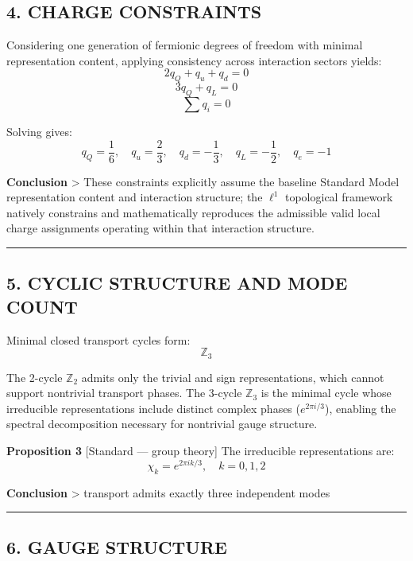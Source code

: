 \documentclass[
]{article}
\begin{document}
\subsection{4. CHARGE CONSTRAINTS}\label{charge-constraints}

Considering one generation of fermionic degrees of freedom with minimal
representation content, applying consistency across interaction sectors
yields: \[
2 q_Q + q_u + q_d = 0
\] \[
3 q_Q + q_L = 0
\] \[
\sum q_i = 0
\]

Solving gives: \[
q_Q = \frac{1}{6}, \quad q_u = \frac{2}{3}, \quad q_d = -\frac{1}{3}, \quad q_L = -\frac{1}{2}, \quad q_e = -1
\]

\textbf{Conclusion} \textgreater{} These constraints explicitly assume
the baseline Standard Model representation content and interaction
structure; the \(\ell^1\) topological framework natively constrains and
mathematically reproduces the admissible valid local charge assignments
operating within that interaction structure.

\begin{center}\rule{0.5\linewidth}{0.5pt}\end{center}

\subsection{5. CYCLIC STRUCTURE AND MODE
COUNT}\label{cyclic-structure-and-mode-count}

Minimal closed transport cycles form: \[
\mathbb{Z}_3
\]

The 2-cycle \(\mathbb{Z}_2\) admits only the trivial and sign
representations, which cannot support nontrivial transport phases. The
3-cycle \(\mathbb{Z}_3\) is the minimal cycle whose irreducible
representations include distinct complex phases (\(e^{2\pi i/3}\)),
enabling the spectral decomposition necessary for nontrivial gauge
structure.

\textbf{Proposition 3} {[}Standard --- group theory{]} The irreducible
representations are: \[
\chi_k = e^{2\pi i k / 3}, \quad k=0,1,2
\]

\textbf{Conclusion} \textgreater{} transport admits exactly three
independent modes

\begin{center}\rule{0.5\linewidth}{0.5pt}\end{center}

\subsection{6. GAUGE STRUCTURE}\label{gauge-structure}
\end{document}
